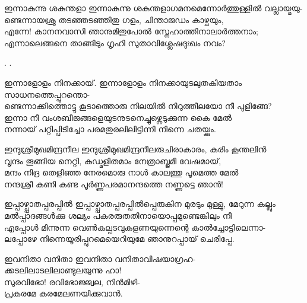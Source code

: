 \begin{enumerate}

\begin{slokam}{\VSv}{\KKN}{ഇന്നാകുന്നു ശകുന്തളാ}
ഇന്നാകുന്നു ശകുന്തളാഗമനമെന്നോർത്തുള്ളിൽ വല്ലായ്മയു-\\
ണ്ടെന്നായശ്രു തടഞ്ഞടഞ്ഞിതു ഗളം, ചിന്താജഡം കാഴ്ചയും,\\
എന്നേ! കാനനവാസി ഞാനുമിതുപോൽ സ്നേഹാത്തിനാലാർത്തനാം; \\
എന്നാലെങ്ങനെ താങ്ങിടും ഗൃഹി സുതാവിശ്ലേഷദുഃഖം നവം? 
\end{slokam}



. 
.


\begin{slokam}{\VSr}{\Unk}{ഇന്നാളോളം നിനക്കായ്.}
ഇന്നാളോളം നിനക്കായുടലുതകിയതാം സാധനത്തെപ്പുറന്തൊ-\\
ണ്ടെന്നാക്കിത്തൊട്ടു കൂടാത്തൊരു നിലയിൽ നിറുത്തീലയോ നീ പുളിങ്ങേ?\\
ഇന്നാ നീ വംശബീജങ്ങളെയുടനുടനെച്ചുഴ്ന്നെടുക്കുന്ന കൈ മേൽ\\
നന്നായ് പറ്റിപ്പിടിച്ചോ പരമതുരലിലിട്ടിന്നി നിന്നെ ചതയ്ക്കും.
\end{slokam}


\begin{slokam}{\VSv}{\Ottoor}{ഇന്ദുശ്രീമുഖമിന്ദ്രനീല}
ഇന്ദുശ്രീമുഖമിന്ദ്രനീലരുചിരാകാരം, കരിം കൂന്തലിൻ\\
വൃന്ദം തൂങ്ങിയ നെറ്റി, കുഡ്മളിതമാം നേത്രാബ്ജമീ വേഷമായ്,\\
മന്ദം നിദ്ര തെളിഞ്ഞ നേരമൊരു നാൾ കാലത്തു പൂമെത്ത മേൽ\\
നന്ദശ്രീ കണി കണ്ട പൂർണ്ണപരമാനന്ദത്തെ നണ്ണട്ടെ ഞാൻ!
\end{slokam}


\begin{slokam}{\VSr}{\RV}{ഇപ്പാഴ്പ്പാതപ്പരപ്പിൽ‌}
ഇപ്പാഴ്പ്പാതപ്പരപ്പിൽ‌പ്പെരുകിന മുരടും മുള്ളു, മേറുന്ന കല്ലും\\
മൽ‌പ്പാദങ്ങൾക്കു ശല്യം പകരരുതതിനായൊപ്പമുണ്ടെങ്കിലും നീ\\
എപ്പോൾ മിന്നുന്ന വെൺകല്പടവുകളണയുന്നെന്റെ കാൽച്ചോട്ടിലെന്നാ-\\
ലപ്പോഴേ നിന്നെയൂരിപ്പുറമെയെറിയുമേ ഞാനുറപ്പായ് ചെരിപ്പേ.
\end{slokam}



\begin{slokam}{\VDv}{\VCBP}{ഇവനിതാ വനിതാ}
ഇവനിതാ വനിതാവിഷയാഗ്രഹ-\\
ക്കടലിലാടലിലാണ്ടുലയുന്നു ഹാ!\\
സുരവിഭോ! രവിഭോജ്ജ്വല, നിൻമിഴി-\\
പ്രകരമേ കരമേലണയിക്കുവാൻ.
\end{slokam}


\end{enumerate}
